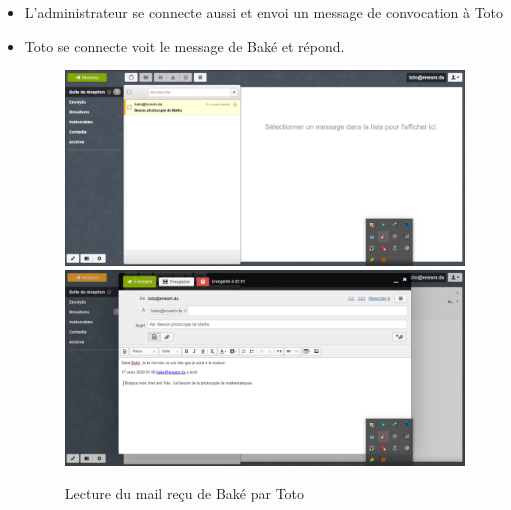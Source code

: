 \documentclass[a4paper,12pt,french]{report} %
\begin{document}
\begin{itemize}
\item L'administrateur se connecte aussi et envoi un message de convocation à Toto 
\item Toto se connecte voit le message de Baké et répond.
\begin{figure}[H]
\centering
\includegraphics[width=483pt]{figure/toto_see_mail_from_bake1.png} \\[1cm]
\includegraphics[width=483pt]{figure/toto_reply_to_bake1.png}
\caption{Lecture du mail reçu de Baké par Toto}
\end{figure} 


\end{itemize}
\end{document}
